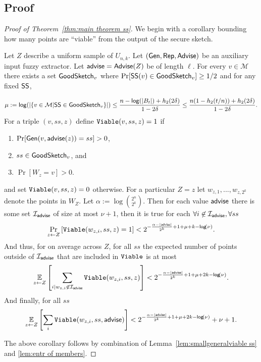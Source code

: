 \subsection{Proof}
\begin{proof}[Proof of Theorem~\ref{thm:main theorem ss}]
We begin with a corollary bounding how many points are ``viable'' from the output of the secure sketch.


\begin{corollary}
\label{corollary:info loss ss}
Let $Z$ describe a uniform sample of $U_{n,k}$.  Let $({\mathsf{Gen}}, {\mathsf{Rep}}, {\mathsf{Advise}})$ be an auxiliary input fuzzy extractor.  Let ${\mathsf{advise}} = {\mathsf{Advise}}(Z)$ be of length $\ell$.       For every $v\in \mathcal{M}$ there exists a set $\mathsf{GoodSketch}_v$ where $\Pr[{\mathsf{SS}}(v)\in \mathsf{GoodSketch}_v] \ge 1/2$ and for any fixed ${\mathsf{SS}}$,
    
    \[
    \mu:=\mathsf{log}\!\left(|\{v \in \mathcal{M} | {\mathsf{SS}} \in \mathsf{GoodSketch}_v\}|\right) \le \frac{n - \mathsf{log}\!\left(|B_t|\right) +h_2(2\delta)}{1-2\delta} \le \frac{n(1-h_2(t/n)) +h_2(2\delta)}{1-2\delta}.
    \]
For a triple $(v, ss, z)$ define $\mathtt{Viable}(v, ss, z)=1$ if
\begin{enumerate}
\itemsep0em
\item $\Pr[{\mathsf{Gen}}(v, {\mathsf{advise}}(z)) = ss]>0$,
\item $ss\in\mathsf{GoodSketch}_v$, and
\item $\Pr[W_z = v]>0$.
\end{enumerate}
and set $\mathtt{Viable}(v, ss, z)=0$ otherwise. 
 For a particular $Z=z$ let $w_{z,1},..., w_{z,2^k}$ denote the points in $W_Z$. Let $\alpha:= \log {2^n\choose 2^k}$.  
 Then for each value ${\mathsf{advise}}$ there is some set $\mathcal{I}_{{\mathsf{advise}}}$ of size at most $\nu+1$, then it is true for each $\forall i\not \in \mathcal{I}_{\mathsf{advise}}, \forall ss$
\[
\Pr_{z\leftarrow Z}\left[\mathtt{Viable}(w_{z,i},ss,z) =1\right]< 2^{-\frac{\alpha-|{\mathsf{advise}}|}{2^k}+1+\mu + k-\mathsf{log}\!\left(\nu\right)}.
\]
And thus, for on average across $Z$, for all $ss$ the expected number of points outside of $\mathcal{I}_{\mathsf{advise}}$ that are included in $\mathtt{Viable}$ is at most 
\begin{align*}
\operatorname*{\mathbb{E}}_{z\leftarrow Z} \left[\sum_{i | w_{z,i}\not\in\mathcal{I}_{\mathsf{advise}}} \mathtt{Viable}(w_{z,i}, ss, z) \right]< 2^{-\frac{\alpha- |{\mathsf{advise}}|}{2^k}+1+\mu+2k-\mathsf{log}\!\left(\nu\right)}.
\end{align*}
And finally, for all $ss$
\begin{align*}
\operatorname*{\mathbb{E}}_{z\leftarrow Z} \left[\sum_{i }  \mathtt{Viable}(w_{z,i}, ss, {\mathsf{advise}})  \right]< 2^{-\frac{\alpha-|{\mathsf{advise}}|}{2^k}+1+\mu+2k-\mathsf{log}\!\left(\nu\right)}+\nu+1.
\end{align*}
\end{corollary}
\noindent
The above corollary follows by combination of Lemma~\ref{lem:smallgeneralviable ss} and \ref{lem:entr of members}.
\end{proof}
